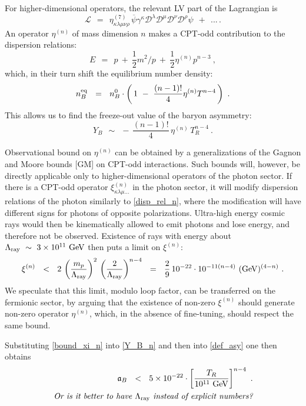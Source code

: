 \documentclass[12pt]{revtex4}
\newcommand{\eq}{{\rm eq}}
\newcommand{\Lray}{\Lambda_{\rm ray}}
\newcommand{\mc}[1]{\mathcal{#1}}
\newcommand{\md}{\mathcal{D}}
\newcommand{\ov}{\overline}
\newcommand{\GeV}{{\rm GeV}}
\begin{document}
	For higher-dimensional operators, the relevant LV part of the 
	Lagrangian is
\[
	\mc{L} ~~=~~ \eta^{(7)}_{\kappa\lambda\mu\nu\rho}\,
	\ov{\psi} \gamma^\kappa \md^\lambda \md^\mu \md^\nu \md^\rho \psi
	~~+~~ ...\,.
\]
	An operator $ \eta^{(n)} $ of mass dimension $ n $ makes a CPT-odd contribution to
	the dispersion relations:
\begin{equation}
\label{disp_rel_n}
	E ~~=~~ p ~+~ \frac 12 m^2/p ~+~ \frac 12 \eta^{(n)} p^{n-3}~,
\end{equation}
	which, in their turn shift the equilibrium number density:
\[
	n_B^\eq ~~=~~ n_B^0 \cdot \left(\, 1 ~-~ \frac{(n-1)!}{4} \eta^{(n)} T^{n-4}
					\,\right)~.
\]
	This allows us to find the freeze-out value of the baryon asymmetry:
\begin{equation}
\label{Y_B_n}
	Y_B ~~\sim~~ -\, \frac{(n-1)!}{4} \, \eta^{(n)} \,T^{n-4}_R~.
\end{equation}
	
	Observational bound on $ \eta^{(n)} $ can be obtained by a generalizations
	of the Gagnon and Moore bounds [GM] on CPT-odd interactions.
	Such bounds will, however, be directly applicable only to higher-dimensional operators
	of the photon sector.
	If there is a CPT-odd operator $ \xi^{(n)}_{\kappa\lambda\mu...} $ in the 
	photon sector, it will modify dispersion relations of the photon similarly
	to \eqref{disp_rel_n}, where the modification will have different signs
	for photons of opposite polarizations.
	Ultra-high energy cosmic rays would then be kinematically allowed to
	emit photons and lose energy, and therefore not be observed.
	Existence of rays with energy about $ \Lray ~\sim~ 3\times10^{11}~\GeV $ then 
	puts a limit on $ \xi^{(n)} $:
\begin{equation}
\label{bound_xi_n}
	\xi^{(n)} ~~<~~ 
	2\, \left( \frac{m_p}{\Lray} \right)^2\, \left(\frac{2}{\Lray}\right)^{n-4}
	~~=~~
	\frac{2}{9}\, 10^{-22}\cdot 10^{-11(n-4)}~(\GeV)^{(4-n)}~.
\end{equation}
	We speculate that this limit, modulo loop factor, can be transferred on the 
	fermionic sector, by arguing that the existence of  non-zero $ \xi^{(n)} $ 
	should generate non-zero operator $ \eta^{(n)} $, which, in the absence of fine-tuning, 
	should respect the same bound.

	Substituting \eqref{bound_xi_n} into \eqref{Y_B_n} and then into 
	\eqref{def_asy} one then obtains
\begin{align}
\notag
	\mathfrak{a}_B ~~<~~ 5 \times 10^{-22}\cdot \left [ \frac{T_R}{10^{11}~\GeV} 
							\right ]^{n-4}~.
	\\
\notag
	\text{\it Or is it better to have $\Lray$ instead of explicit numbers?}
\end{align}
\end{document}
